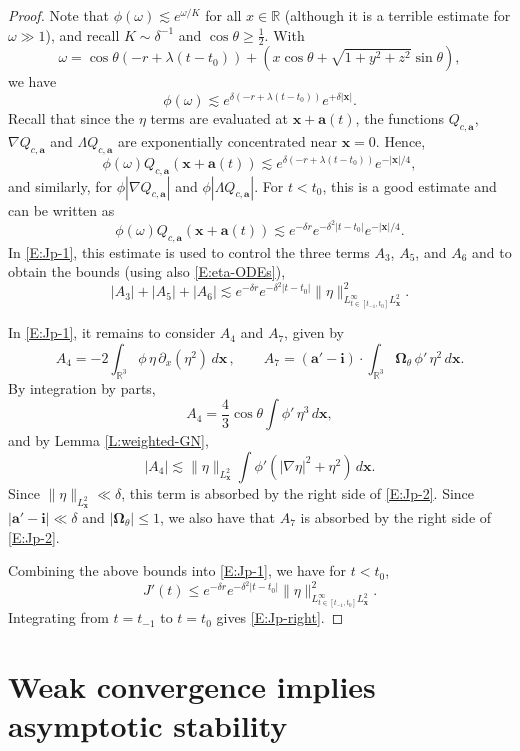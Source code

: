 \documentclass[12pt,letterpaper]{amsart}
\theoremstyle{remark}
\numberwithin{equation}{section}
\numberwithin{theorem}{section}
\numberwithin{table}{section}
\begin{document}
\begin{proof}
Note that $\phi(\omega) \lesssim e^{\omega/K}$ for all $x\in \mathbb{R}$ (although it is a terrible estimate for $\omega\gg 1$), and recall $K \sim \delta^{-1}$ and $\cos\theta \geq \frac12$.  With
$$
\omega = \cos\theta(-r + \lambda(t-t_0)) + (x \cos \theta + \sqrt{1+y^2+z^2} \sin \theta),
$$
we have
$$
\phi(\omega) \lesssim e^{\delta(-r+ \lambda(t-t_0))} e^{+\delta |\mathbf{x}|}.
$$
Recall that since the $\eta$ terms are evaluated at $\mathbf{x}+\mathbf{a}(t)$, the functions $Q_{c,\mathbf{a}}$, $\nabla Q_{c,\mathbf{a}}$ and $\Lambda Q_{c,\mathbf{a}}$ are exponentially concentrated near $\mathbf{x}=0$.  Hence,
$$
\phi(\omega) Q_{c,\mathbf{a}}(\mathbf{x}+\mathbf{a}(t)) \lesssim e^{\delta(-r+\lambda(t-t_0))} e^{-|\mathbf{x}|/4},
$$
and similarly, for $\phi |\nabla Q_{c,\mathbf{a}}|$ and $\phi |\Lambda Q_{c,\mathbf{a}}|$.  
For $t<t_0$, this is a good estimate and can be written as
$$
\phi(\omega) Q_{c,\mathbf{a}}(\mathbf{x}+\mathbf{a}(t)) \lesssim e^{-\delta r} e^{-\delta^2 |t-t_0|} e^{-|\mathbf{x}|/4}.
$$
In \eqref{E:Jp-1}, this estimate is used to control the three terms $A_3$, $A_5$, and $A_6$ and to obtain the bounds (using also \eqref{E:eta-ODEs}),
$$
|A_3|+|A_5|+|A_6| \lesssim  e^{-\delta r} e^{-\delta^2|t-t_0|} \| \eta\|_{L_{t\in [t_{-1},t_0]}^\infty L_{\mathbf{x}}^2}^2.
$$
 
In \eqref{E:Jp-1}, it remains to consider $A_4$ and $A_7$, given by  
$$
A_4=-2 \int_{\mathbb{R}^3} \phi \, \eta \, \partial_x (\eta^2) \, d\mathbf{x} \,,  \qquad A_7= (\mathbf{a}' - \mathbf{i})\cdot \int_{\mathbb{R}^3} \boldsymbol{\Omega}_\theta \, \phi'  \, \eta^2  \, d\mathbf{x}.
$$
By integration by parts,
$$
A_4 = \frac43 \cos \theta \int \phi' \, \eta^3 \, d\mathbf{x},
$$
and by Lemma \ref{L:weighted-GN},
$$
|A_4| \lesssim \| \eta\|_{L_{\mathbf{x}}^2} \int \phi' (|\nabla \eta|^2 + \eta^2) \, d\mathbf{x}.
$$
Since $\|\eta\|_{L_{\mathbf{x}}^2} \ll \delta$, this term is absorbed by the right side of \eqref{E:Jp-2}.  Since $|\mathbf{a}'-\mathbf{i}| \ll \delta$ and $|\boldsymbol{\Omega}_\theta| \leq 1$, we also have that $A_7$ is absorbed by the right side of \eqref{E:Jp-2}.

Combining the above bounds into \eqref{E:Jp-1}, we have for $t<t_0$,
$$
J'(t) \leq e^{-\delta r} e^{-\delta^2 |t-t_0|} \| \eta \|_{L_{t\in [t_{-1},t_0]}^\infty L_{\mathbf{x}}^2}^2.
$$
Integrating from $t=t_{-1}$ to $t=t_0$ gives \eqref{E:Jp-right}.
\end{proof}



\section{Weak convergence implies asymptotic stability}
\label{S:proof-main-theorem}
\end{document}
